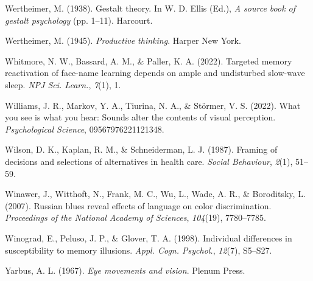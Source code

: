 \documentclass[
]{krantz}
\newlength{\cslhangindent}
\newlength{\cslentryspacingunit} %
\newenvironment{CSLReferences}[2] %
 {%
  \setlength{\parindent}{0pt}
  \ifodd #1
  \let\oldpar\par
  \def\par{\hangindent=\cslhangindent\oldpar}
  \fi
  \setlength{\parskip}{#2\cslentryspacingunit}
 }%
 {}
\begin{document}
\begin{CSLReferences}{1}{0}
\leavevmode{}%
Wertheimer, M. (1938). Gestalt theory. In W. D. Ellis (Ed.), \emph{A source book of gestalt psychology} (pp. 1--11). Harcourt.

\leavevmode{}%
Wertheimer, M. (1945). \emph{Productive thinking}. Harper New York.

\leavevmode{}%
Whitmore, N. W., Bassard, A. M., \& Paller, K. A. (2022). Targeted memory reactivation of face-name learning depends on ample and undisturbed slow-wave sleep. \emph{NPJ Sci. Learn.}, \emph{7}(1), 1.

\leavevmode{}%
Williams, J. R., Markov, Y. A., Tiurina, N. A., \& Störmer, V. S. (2022). What you see is what you hear: Sounds alter the contents of visual perception. \emph{Psychological Science}, 09567976221121348.

\leavevmode{}%
Wilson, D. K., Kaplan, R. M., \& Schneiderman, L. J. (1987). Framing of decisions and selections of alternatives in health care. \emph{Social Behaviour}, \emph{2}(1), 51--59.

\leavevmode{}%
Winawer, J., Witthoft, N., Frank, M. C., Wu, L., Wade, A. R., \& Boroditsky, L. (2007). Russian blues reveal effects of language on color discrimination. \emph{Proceedings of the National Academy of Sciences}, \emph{104}(19), 7780--7785.

\leavevmode{}%
Winograd, E., Peluso, J. P., \& Glover, T. A. (1998). Individual differences in susceptibility to memory illusions. \emph{Appl. Cogn. Psychol.}, \emph{12}(7), S5--S27.

\leavevmode{}%
Yarbus, A. L. (1967). \emph{Eye movements and vision}. Plenum Press.

\end{CSLReferences}
\end{document}
